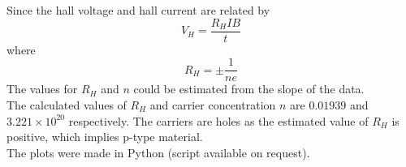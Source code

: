 \documentclass[11pt, a4paper]{article}
\begin{document}
	Since the hall voltage and hall current are related by $$ V_H = \frac{R_H I B}{t} $$ where $$ R_H = \pm \frac{1}{ne}$$
	The values for $R_H$ and $n$ could be estimated from the slope of the data.\\
	
	The calculated values of $R_H$ and carrier concentration $n$ are $0.01939$ and $3.221\times 10^{20}$ respectively. The carriers are holes as the estimated value of $R_H$ is positive, which implies p-type material.\\
	
	The plots were made in Python (script available on request).
	
\end{document}
